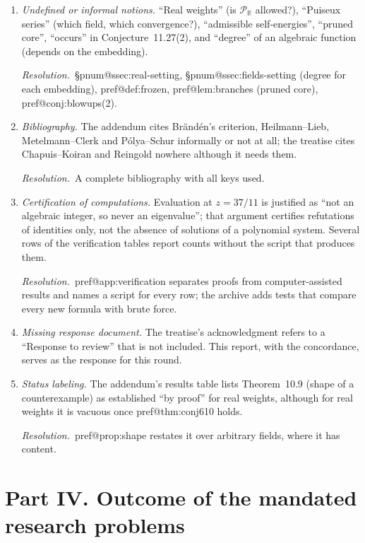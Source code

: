 \documentclass[11pt]{amsart}
\makeatletter
\newcommand{\pref}[1]{\csname pref@#1\endcsname}
\newcommand{\pnum}[1]{\csname pnum@#1\endcsname}
\newcommand{\Puis}{\mathcal{P}_{\mathbb{R}}}
\newcommand{\fix}{\par\noindent\emph{Resolution.}\ }
\makeatother
\begin{document}
\begin{enumerate}[label=\textbf{III.\arabic*},leftmargin=*,widest=III.8]
\item \emph{Undefined or informal notions.} ``Real weights'' (is $\Puis$ allowed?), ``Puiseux series'' (which field, which convergence?), ``admissible self-energies'', ``pruned core'', ``occurs'' in Conjecture~11.27(2), and ``degree'' of an algebraic function (depends on the embedding).
\fix \S\pnum{ssec:real-setting}, \S\pnum{ssec:fields-setting} (degree for each embedding), \pref{def:frozen}, \pref{lem:branches} (pruned core), \pref{conj:blowups}(2).

\item \emph{Bibliography.} The addendum cites Br\"and\'en's criterion, Heilmann--Lieb, Metelmann--Clerk and P\'olya--Schur informally or not at all; the treatise cites Chapuis--Koiran and Reingold nowhere although it needs them.
\fix A complete bibliography with all keys used.

\item \emph{Certification of computations.} Evaluation at $z=37/11$ is justified as ``not an algebraic integer, so never an eigenvalue''; that argument certifies refutations of identities only, not the absence of solutions of a polynomial system. Several rows of the verification tables report counts without the script that produces them.
\fix \pref{app:verification} separates proofs from computer-assisted results and names a script for every row; the archive adds tests that compare every new formula with brute force.

\item \emph{Missing response document.} The treatise's acknowledgment refers to a ``Response to review'' that is not included. This report, with the concordance, serves as the response for this round.

\item \emph{Status labeling.} The addendum's results table lists Theorem~10.9 (shape of a counterexample) as established ``by proof'' for real weights, although for real weights it is vacuous once \pref{thm:conj610} holds.
\fix \pref{prop:shape} restates it over arbitrary fields, where it has content.
\end{enumerate}

\section*{Part IV. Outcome of the mandated research problems}
\end{document}
